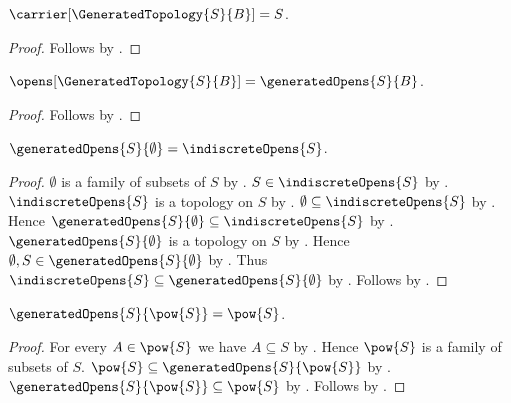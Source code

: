 \begin{proposition}\label{generated_topology_carrier}
    $\carrier[\GeneratedTopology{S}{B}]=S$.
\end{proposition}
\begin{proof}
    Follows by .
\end{proof}

\begin{proposition}\label{generated_topology_opens}
    $\opens[\GeneratedTopology{S}{B}]=\generatedOpens{S}{B}$.
\end{proposition}
\begin{proof}
    Follows by .
\end{proof}

\begin{theorem}\label{empty_family_generates_indiscrete_opens}
    $\generatedOpens{S}{\emptyset}=\indiscreteOpens{S}$.
\end{theorem}
\begin{proof}
    $\emptyset$ is a family of subsets of $S$ by
        .
    $S\in\indiscreteOpens{S}$ by
        .
    $\indiscreteOpens{S}$ is a topology on $S$ by
        .
    $\emptyset\subseteq\indiscreteOpens{S}$ by
        .
    Hence $\generatedOpens{S}{\emptyset}\subseteq\indiscreteOpens{S}$ by
        .
    $\generatedOpens{S}{\emptyset}$ is a topology on $S$ by
        .
    Hence $\emptyset,S\in\generatedOpens{S}{\emptyset}$ by
        .
    Thus $\indiscreteOpens{S}\subseteq\generatedOpens{S}{\emptyset}$ by
        .
    Follows by .
\end{proof}

\begin{theorem}\label{powerset_generates_discrete_opens}
    $\generatedOpens{S}{\pow{S}}=\pow{S}$.
\end{theorem}
\begin{proof}
    For every $A\in\pow{S}$ we have $A\subseteq S$ by
        .
    Hence $\pow{S}$ is a family of subsets of $S$.
    $\pow{S}\subseteq\generatedOpens{S}{\pow{S}}$ by
        .
    $\generatedOpens{S}{\pow{S}}\subseteq\pow{S}$ by
        .
    Follows by .
\end{proof}
